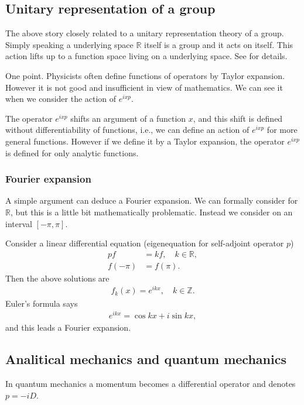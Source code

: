 \documentclass[openany, a4paper, oneside]{book}
\theoremstyle{break}
\theoremstyle{breakdefn}
\newcommand{\bbR}{\mathbb{R}}
\newcommand{\bbZ}{\mathbb{Z}}
\begin{document}
\subsection{Unitary representation of a group}
\label{sec-4-1-4-2}

The above story closely related to a unitary representation theory of a group.
Simply speaking a underlying space $\bbR$ itself is a group
and it acts on itself.
This action lifts up to a function space living on a underlying space.
See \cite{KobayashiOshima1} for details.

One point.
Physicists often define functions of operators by Taylor expansion.
However it is not good and insufficient in view of mathematics.
We can see it when we consider the action of $e^{ixp}$.

The operator $e^{i x p}$ shifts an argument of a function $x$,
and this shift is defined without differentiability of functions,
i.e., we can define an action of $e^{ixp}$ for more general functions.
However if we define it by a Taylor expansion,
the operator $e^{ixp}$ is defined for only analytic functions.
\subsubsection{Fourier expansion}
\label{sec-4-1-4-2-1}

A simple argument can deduce a Fourier expansion.
We can formally consider for $\bbR$,
but this is a little bit mathematically problematic.
Instead we consider on an interval $[ - \pi, \pi]$.

Consider a linear differential equation (eigenequation for
self-adjoint operator $p$)
\begin{align}
 p f
 &=
 k f, \quad k \in \bbR, \\
 f(-\pi)
 &=
 f(\pi).
\end{align}
Then the above solutions are
\begin{align}
 f_k(x)
 =
 e^{ikx}, \quad
 k \in \bbZ.
\end{align}
Euler's formula says
\begin{align}
 e^{ikx}
 =
 \cos kx + i \sin kx,
\end{align}
and this leads a Fourier expansion.
\subsection{Analitical mechanics and quantum mechanics}
\label{sec-4-1-4-3}

In quantum mechanics a momentum becomes a differential operator
and denotes $p = -i D$.
\end{document}

